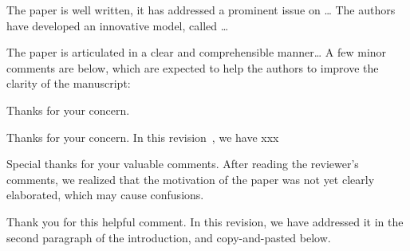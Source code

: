 \documentclass{ar2rc}
\begin{document}
The paper is well written,
it has addressed a prominent issue on \dots
The authors have developed an innovative model,
called \dots

The paper is articulated in a clear and comprehensible manner\dots
A few minor comments are below,
which are expected to help the authors
to improve the clarity of the manuscript:

\begin{RC}
    \blindtext
\end{RC}

\begin{AR}
    Thanks for your concern.
    \blindtext
    \begin{quote}
        {
        
        \lipsum[1]
        }
    \end{quote}
\end{AR}



\setcounter{reviewer}{2}
\reviewersection

\begin{RC}
    \blindtext
\end{RC}

\begin{AR}
    Thanks for your concern.
    In this revision~\citep{BJL11J01}, 
    we have xxx
\end{AR}


\begin{RC}
    \blindtext
\end{RC}

\begin{AR}
    Special thanks for your valuable comments.
    After reading the reviewer's comments, 
    we realized that the motivation of the paper was not yet clearly elaborated, 
    which may cause confusions.

    \blindmathpaper
\end{AR}



\setcounter{reviewer}{3}
\reviewersection

\begin{RC}
    \lipsum[1]
\end{RC}

\begin{AR}
    Thank you for this helpful comment. In this revision,
    we have addressed it in the second paragraph of the introduction, and copy-and-pasted below.

    \begin{quote}
        {
        \lipsum[1]
        }
    \end{quote}
\end{AR}
\end{document}
